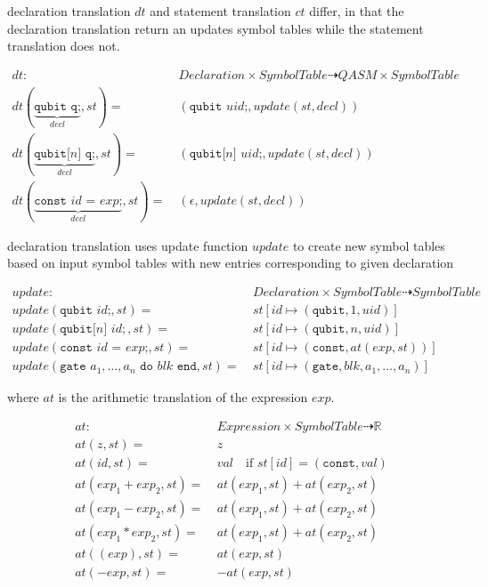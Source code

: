 declaration translation $dt$ and statement translation $ct$ differ, in that the declaration translation return an updates symbol tables while the statement translation does not. 

\begin{align*}
    dt : \ & Declaration \times SymbolTable \dashrightarrow QASM \times SymbolTable\\
    dt(\underbrace{\texttt{qubit q;}}_{decl}, st) = \ & (\texttt{qubit } uid\texttt{;}, update(st, decl))\\
    dt(\underbrace{\texttt{qubit[} n \texttt{] q;}}_{decl}, st) = \ & (\texttt{qubit[}n \texttt{] } uid\texttt{;}, update(st, decl))\\
    dt(\underbrace{\texttt{const } id \texttt{ = } exp \texttt{;}}_{decl}, st) = \ & (\epsilon, update(st, decl))
\end{align*}

declaration translation uses update function $update$ to create new symbol tables based on input symbol tables with new entries corresponding to given declaration

\begin{align*}
    update : \ & Declaration \times SymbolTable \dashrightarrow SymbolTable\\
    update(\texttt{qubit } id\texttt{;}, st) = \ & st[id \mapsto (\texttt{qubit}, 1, uid)]\\
    update(\texttt{qubit[}n \texttt{] } id{;}, st) = \ & st[id \mapsto (\texttt{qubit}, n, uid)]\\
    update(\texttt{const } id \texttt{ = } exp \texttt{;}, st) = \ & st[id \mapsto (\texttt{const}, at(exp, st))]\\
    update(\texttt{gate } a_1, \dots, a_n \texttt{ do } blk \texttt{ end}, st) = \ & st[id \mapsto (\texttt{gate}, blk, a_1, \dots, a_n)]
\end{align*}

where $at$ is the arithmetic translation of the expression $exp$.


\begin{align*}
    at : \ & Expression \times SymbolTable \dashrightarrow \mathbb{R}\\
    at(z, st) = \ & z\\
    at(id, st) = \ & val \quad \text{if } st[id] = (\texttt{const}, val)\\
    at(exp_1 + exp_2, st) = \ & at(exp_1, st) + at(exp_2, st)\\
    at(exp_1 - exp_2, st) = \ & at(exp_1, st) + at(exp_2, st)\\
    at(exp_1 * exp_2, st) = \ & at(exp_1, st) + at(exp_2, st)\\
    at((exp), st) = \ & at(exp, st)\\
    at(-exp, st) = \ & -at(exp, st)
\end{align*}


